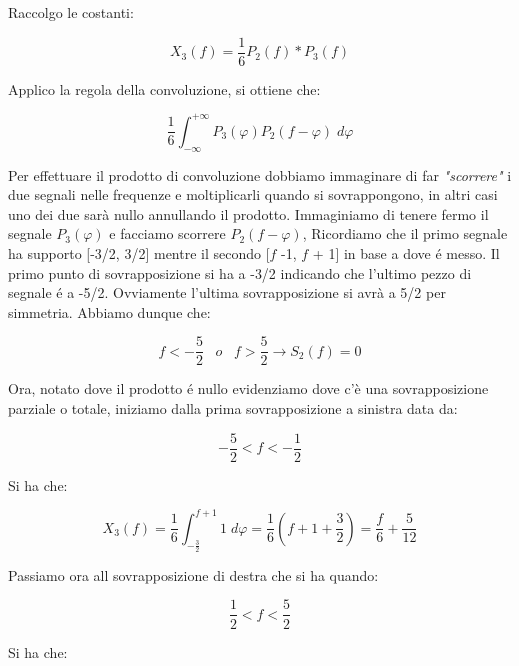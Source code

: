 \documentclass[../main.tex]{subfiles}
\begin{document}
Raccolgo le costanti:

\begin{equation}
	X_3(f) = \frac{1}{6} P_2(f) \ast P_3(f)
\end{equation}

Applico la regola della convoluzione, si ottiene che:

\begin{equation}
	\frac{1}{6} \int_{-\infty}^{+\infty} P_3(\varphi)P_2(f - \varphi)\; d\varphi
\end{equation}


Per effettuare il prodotto di convoluzione dobbiamo immaginare di far \textit{"scorrere"} i due segnali nelle frequenze e moltiplicarli quando si sovrappongono, in altri casi uno dei due sarà nullo annullando il prodotto.
Immaginiamo di tenere fermo il segnale $P_3(\varphi)$ e facciamo scorrere $P_2(f - \varphi)$, Ricordiamo che il primo segnale ha supporto [-3/2, 3/2] mentre il secondo [$f$ -1, $f$ + 1] in base a dove é messo.
Il primo punto di sovrapposizione si ha a -3/2 indicando che l'ultimo pezzo di segnale é a -5/2. Ovviamente l'ultima sovrapposizione si avrà a 5/2 per simmetria. Abbiamo dunque che:

\begin{equation}
	f < - \frac{5}{2} \hspace{10pt} \unit{o} \hspace{10pt} f > \frac{5}{2}  \rightarrow S_2(f) = 0
\end{equation}

Ora, notato dove il prodotto é nullo evidenziamo dove c'è una sovrapposizione parziale o totale, iniziamo dalla prima sovrapposizione a sinistra data da:

\begin{equation}
	- \frac{5}{2} < f < - \frac{1}{2}
\end{equation}

Si ha che:

\begin{equation}
	X_3(f) = \frac{1}{6} \int_{- \frac{3}{2}}^{f + 1} 1 \; d\varphi = \frac{1}{6} \left( f + 1 + \frac{3}{2} \right) = \frac{f}{6} + \frac{5}{12}
\end{equation}

Passiamo ora all sovrapposizione di destra che si ha quando:

\begin{equation}
	\frac{1}{2} < f <  \frac{5}{2}
\end{equation}

Si ha che:
\end{document}
